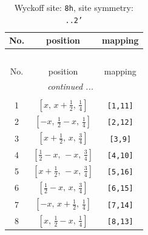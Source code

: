 \documentclass[fleqn,8pt]{jsarticle}
\begin{document}
\begin{longtable}{ccc}
\caption{Wyckoff site: {\tt 8h}, site symmetry: {\tt ..2'}}
 \\
 \hline \hline
No. & position & mapping \\ \hline \endfirsthead

\multicolumn{2}{l}{\tablename\ \thetable{}} \\
 \hline \hline
No. & position & mapping \\ \hline \endhead

 \hline \hline
\multicolumn{2}{r}{\footnotesize\it continued ...} \\ \endfoot

 \hline \hline
\multicolumn{2}{r}{} \\ \endlastfoot

1 & $\left[ x,\, x + \frac{1}{2},\, \frac{1}{4} \right]$ & {\tt [1,11]} \\ \hline
2 & $\left[ - x,\, \frac{1}{2} - x,\, \frac{1}{4} \right]$ & {\tt [2,12]} \\ \hline
3 & $\left[ x + \frac{1}{2},\, x,\, \frac{3}{4} \right]$ & {\tt [3,9]} \\ \hline
4 & $\left[ \frac{1}{2} - x,\, - x,\, \frac{3}{4} \right]$ & {\tt [4,10]} \\ \hline
5 & $\left[ x + \frac{1}{2},\, - x,\, \frac{3}{4} \right]$ & {\tt [5,16]} \\ \hline
6 & $\left[ \frac{1}{2} - x,\, x,\, \frac{3}{4} \right]$ & {\tt [6,15]} \\ \hline
7 & $\left[ - x,\, x + \frac{1}{2},\, \frac{1}{4} \right]$ & {\tt [7,14]} \\ \hline
8 & $\left[ x,\, \frac{1}{2} - x,\, \frac{1}{4} \right]$ & {\tt [8,13]} \\
\end{longtable}
\renewcommand{\arraystretch}{1.2}
\end{document}
